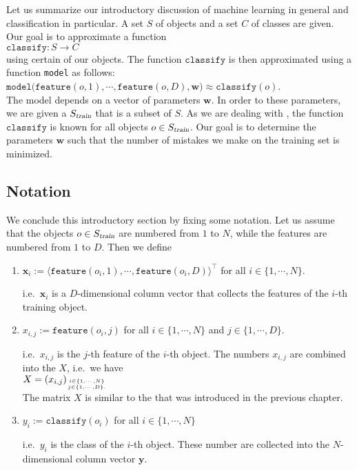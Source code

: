 Let us summarize our introductory discussion of machine learning in general and classification in particular.
A set $S$ of objects and a set $C$ of classes are given.  Our goal is to approximate a function
\\[0.2cm]
\hspace*{1.3cm}
$\mathtt{classify}: S \rightarrow C$
\\[0.2cm]
using certain   of our objects.  The function $\mathtt{classify}$ is then approximated using a function
\texttt{model} as follows:
\\[0.2cm]
\hspace*{1.3cm}
$\mathtt{model}\bigl(\mathtt{feature}(o,1), \cdots, \mathtt{feature}(o,D), \mathbf{w}\bigr) \approx \mathtt{classify}(o)$.
\\[0.2cm]
The model depends on a vector of parameters $\mathbf{w}$.  In order to  these parameters, we are given a 
 $S_\textsl{train}$ that is a subset of $S$.  As we are dealing with ,
 the function 
$\mathtt{classify}$ is known for all objects $o \in S_\textsl{train}$.   Our goal is to determine the parameters $\mathbf{w}$ such that the
number of mistakes we make on the training set is minimized.  

\subsection{Notation}
We conclude this introductory section by fixing some notation.  Let us assume that the objects $o \in S_\textsl{train}$
are numbered 
from $1$ to $N$, while the features are numbered from $1$ to $D$.  Then we define
\begin{enumerate}
\item $\textbf{x}_i := \langle\mathtt{feature}(o_i, 1), \cdots, \mathtt{feature}(o_i, D)\rangle^\top$ \quad for all $i \in \{1, \cdots, N\}$.
  
      i.e.~$\mathbf{x}_i$ is a $D$-dimensional column vector that collects the features of the $i$-th training object.
\item $x_{i,j} := \mathtt{feature}(o_i, j)$ \quad for all $i \in \{1, \cdots, N\}$ and $j \in \{1, \cdots, D\}$.

      i.e.~$x_{i,j}$ is the $j$-th feature of the $i$-th object.  The numbers $x_{i,j}$ are combined into the
       $X$,  i.e.~we have
      \\[0.2cm]
      \hspace*{1.3cm}
      $X=(x_{i,j})_{i\in\{1,\cdots,N\} \atop j \in \{1,\cdots,D\}.}$
      \\[0.2cm]
      The matrix $X$ is similar to the  that was introduced in the previous chapter.
\item $y_i := \mathtt{classify}(o_i)$ \quad for all $i \in \{1, \cdots, N\}$

      i.e.~$y_i$ is the class of the $i$-th object.  These number are collected into the $N$-dimensional column vector $\mathbf{y}$.
\end{enumerate}

